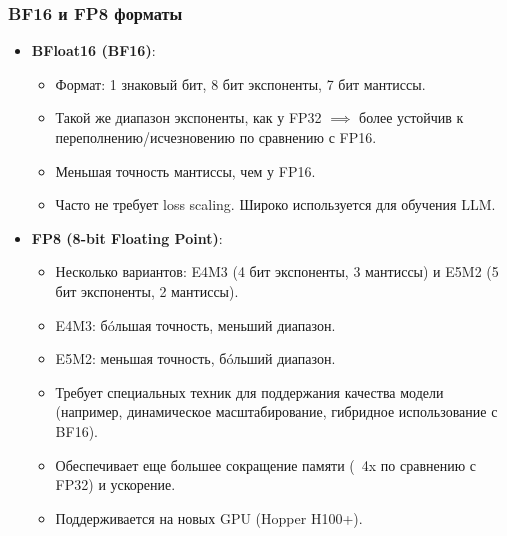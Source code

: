 \begin{frame}
  \frametitle{BF16 и FP8 форматы}
  \begin{itemize}
    \item \textbf{BFloat16 (BF16)}:
      \begin{itemize}
        \item Формат: 1 знаковый бит, 8 бит экспоненты, 7 бит мантиссы.
        \item Такой же диапазон экспоненты, как у FP32 $\implies$ более устойчив к переполнению/исчезновению по сравнению с FP16.
        \item Меньшая точность мантиссы, чем у FP16.
        \item Часто не требует loss scaling. Широко используется для обучения LLM.
      \end{itemize}
    \item \textbf{FP8 (8-bit Floating Point)}:
      \begin{itemize}
        \item Несколько вариантов: E4M3 (4 бит экспоненты, 3 мантиссы) и E5M2 (5 бит экспоненты, 2 мантиссы).
        \item E4M3: бóльшая точность, меньший диапазон.
        \item E5M2: меньшая точность, бóльший диапазон.
        \item Требует специальных техник для поддержания качества модели (например, динамическое масштабирование, гибридное использование с BF16).
        \item Обеспечивает еще большее сокращение памяти (~4x по сравнению с FP32) и ускорение.
        \item Поддерживается на новых GPU (Hopper H100+).
      \end{itemize}
  \end{itemize}
\end{frame}
